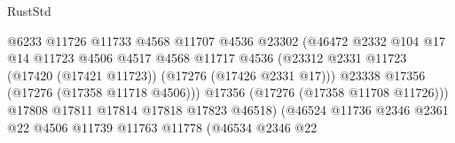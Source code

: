 \begin{lexlean}{RustStd}
\begin{coremodule}
                                                @6233
                                                @11726
                                                @11733
                                                @4568
                                                @11707
                                                @4536
                                                @23302
                                                (@46472
                                                  @2332
                                                  @104
                                                  @17
                                                  @14
                                                  @11723
                                                  @4506
                                                  @4517
                                                  @4568
                                                  @11717
                                                  @4536
                                                  (@23312
                                                    @2331
                                                    @11723
                                                    (@17420 (@17421 @11723))
                                                    (@17276 (@17426 @2331 @17)))
                                                  @23338
                                                  @17356
                                                  (@17276 (@17358 @11718 @4506)))
                                                @17356
                                                (@17276 (@17358 @11708 @11726)))
                                              @17808
                                              @17811
                                              @17814
                                              @17818
                                              @17823
                                              @46518)
                                            (@46524
                                              @11736
                                              @2346
                                              @2361
                                              @22
                                              @4506
                                              @11739
                                              @11763
                                              @11778
                                              (@46534
                                                @2346
                                                @22

\end{coremodule}
\end{lexlean}
